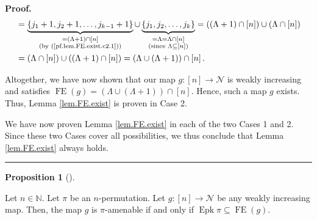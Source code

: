 \documentclass[numbers=enddot,12pt,final,onecolumn,notitlepage]{scrartcl}%
\theoremstyle{definition}
\newtheorem{prop}[theo]{Proposition}
\newenvironment{proposition}[1][]
{\begin{prop}[#1]\begin{leftbar}}
{\end{leftbar}\end{prop}}
\newenvironment{proof}[1][Proof]{\noindent\textbf{#1.} }{\ \rule{0.5em}{0.5em}}
\newenvironment{verlong}{}{}
\begin{document}
\begin{verlong}
\begin{proof}
\begin{align*}
&  =\underbrace{\left\{  j_{1}+1,j_{2}+1,\ldots,j_{k-1}+1\right\}
}_{\substack{=\left(  \Lambda+1\right)  \cap\left[  n\right]  \\\text{(by
(\ref{pf.lem.FE.exist.c2.1}))}}}\cup\underbrace{\left\{  j_{1},j_{2}%
,\ldots,j_{k}\right\}  }_{\substack{=\Lambda=\Lambda\cap\left[  n\right]
\\\text{(since }\Lambda\subseteq\left[  n\right]  \text{)}}}=\left(  \left(
\Lambda+1\right)  \cap\left[  n\right]  \right)  \cup\left(  \Lambda
\cap\left[  n\right]  \right) \\
&  =\left(  \Lambda\cap\left[  n\right]  \right)  \cup\left(  \left(
\Lambda+1\right)  \cap\left[  n\right]  \right)  =\left(  \Lambda\cup\left(
\Lambda+1\right)  \right)  \cap\left[  n\right]  .
\end{align*}


Altogether, we have now shown that our map $g:\left[  n\right]  \rightarrow
\mathcal{N}$ is weakly increasing and satisfies $\operatorname*{FE}\left(
g\right)  =\left(  \Lambda\cup\left(  \Lambda+1\right)  \right)  \cap\left[
n\right]  $. Hence, such a map $g$ exists. Thus, Lemma \ref{lem.FE.exist} is
proven in Case 2.

We have now proven Lemma \ref{lem.FE.exist} in each of the two Cases 1 and 2.
Since these two Cases cover all possibilities, we thus conclude that Lemma
\ref{lem.FE.exist} always holds.
\end{proof}
\end{verlong}

\begin{proposition}
\label{prop.Epk.fiberends}Let $n\in\mathbb{N}$.
Let $\pi$ be an $n$-permutation.
Let $g:\left[  n\right]
\rightarrow\mathcal{N}$ be any weakly increasing map. Then, the map $g$ is
$\pi$-amenable if and only if $\operatorname*{Epk}\pi\subseteq
\operatorname*{FE}\left(  g\right)  $.
\end{proposition}
\end{document}
